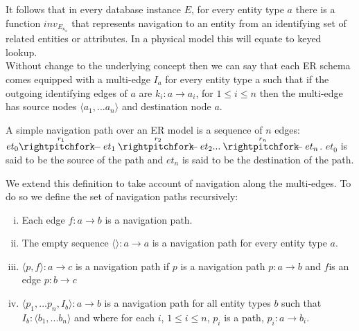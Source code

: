 \documentclass[10pt,a4paper]{article}
\begin{document}
\noindent It follows that in every database instance $E$, for every entity type $a$ there is a function 
$inv_{E_{\kappa_a}}$ that represents navigation to an entity from an identifying set of related entities or attributes. 
In a physical model this will equate to keyed lookup. \\

\noindent Without change to the underlying concept then we can say that each ER schema comes equipped with a multi-edge $I_a$ for every entity type a such that if 
the outgoing identifying edges of $a$ are $k_i: a \rightarrow a_i$, for $1 \leq i \leq n$  then the multi-edge has source nodes $\langle a_1,...a_n\rangle$ and destination node $a$.  

\noindent A simple navigation path over an ER model  is a
sequence of  $n$ edges:
$\overset{r_1}{et_0 \rightpitchfork \hspace{-0.35em} -  et_1} \overset{r_2}{\rightpitchfork \hspace{-0.35em} -} et_2 ... \overset{r_n}{\rightpitchfork \hspace{-0.35em} -} et_n$.  $et_0$ is said to be the source of the path and $et_n$ is said to be the destination of the path. 

\noindent We extend this definition to take account of navigation along the multi-edges. To do so we define the set of navigation paths recursively:

\begin{enumerate} [(i)]
\item{ Each edge $f: a \rightarrow b$ is a navigation path.
}
\item{ The empty sequence  $\langle \rangle : a \rightarrow a$ is a navigation path for every entity type $a$.
}
\item{ $\langle p,f \rangle : a \rightarrow c$ is a navigation path  if $p$ is a navigation path $p: a \rightarrow b$ and $f $is an edge $p: b \rightarrow c$
}
\item{ $\langle p_1,...p_n,I_b\rangle : a \rightarrow b$ is a navigation path for all entity types $b$ such that $I_b: \langle b_1,...b_n\rangle$ and where
for each $i$, $1 \leq i \leq n$, $p_i$ is a path, $p_i: a \rightarrow b_i$.   
}
\end{enumerate}
\end{document}
